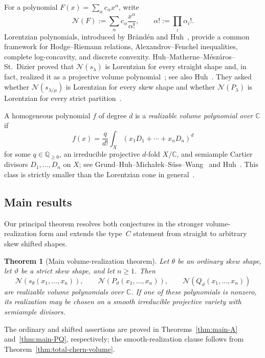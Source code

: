 \documentclass[11pt,a4paper,oneside]{amsart}
\numberwithin{equation}{section}
\newtheorem{theorem}{Theorem}[section]
\theoremstyle{definition}
\theoremstyle{remark}
\newcommand{\Q}{\mathbb Q}
\newcommand{\C}{\mathbb C}
\newcommand{\cN}{\mathcal N}
\begin{document}
For a polynomial $F(x)=\sum_\alpha c_\alpha x^\alpha$, write
\[
 \cN(F):=\sum_\alpha c_\alpha\frac{x^\alpha}{\alpha!},
 \qquad
 \alpha!:=\prod_i\alpha_i!.
\]
Lorentzian polynomials, introduced by Br\"and\'en and Huh~\cite{BH20}, provide a common framework for Hodge--Riemann relations, Alexandrov--Fenchel inequalities, complete log-concavity, and discrete convexity.  Huh--Matherne--M\'esz\'aros--St.~Dizier proved that $\cN(s_\lambda)$ is Lorentzian for every straight shape and, in fact, realized it as a projective volume polynomial~\cite[Theorem~3 and pp.~4413--4414]{HMMSD22}; see also Huh~\cite[Example~3.6]{HuhVolume26}.  They asked whether $\cN(s_{\lambda/\mu})$ is Lorentzian for every skew shape and whether $\cN(P_\lambda)$ is Lorentzian for every strict partition~\cite[Conjectures~19 and~20]{HMMSD22}.

A homogeneous polynomial $f$ of degree $d$ is a \emph{realizable volume polynomial over $\C$} if
\[
 f(x)=\frac{q}{d!}\int_X(x_1D_1+\cdots+x_nD_n)^d
\]
for some $q\in\Q_{\geq0}$, an irreducible projective $d$-fold $X/\C$, and semiample Cartier divisors $D_1,\ldots,D_n$ on $X$; see Grund--Huh--Micha\l ek--S\"uss--Wang~\cite[Definition~1.1]{GHMSW25} and Huh~\cite[Definition~3.1]{HuhVolume26}.  This class is strictly smaller than the Lorentzian cone in general~\cite[Section~3.2]{HuhVolume26}.

\subsection{Main results}

Our principal theorem resolves both conjectures in the stronger volume-realization form and extends the type~$C$ statement from straight to arbitrary skew shifted shapes.

\begin{theorem}[Main volume-realization theorem]\label{thm:intro-volume}
Let $\theta$ be an ordinary skew shape, let $\vartheta$ be a strict skew shape, and let $n\geq1$.  Then
\[
 \cN(s_\theta(x_1,\ldots,x_n)),\qquad
 \cN(P_\vartheta(x_1,\ldots,x_n)),\qquad
 \cN(Q_\vartheta(x_1,\ldots,x_n))
\]
are realizable volume polynomials over $\C$.  If one of these polynomials is nonzero, its realization may be chosen on a smooth irreducible projective variety with semiample divisors.
\end{theorem}

The ordinary and shifted assertions are proved in Theorems~\ref{thm:main-A} and~\ref{thm:main-PQ}, respectively; the smooth-realization clause follows from Theorem~\ref{thm:total-chern-volume}.
\end{document}
